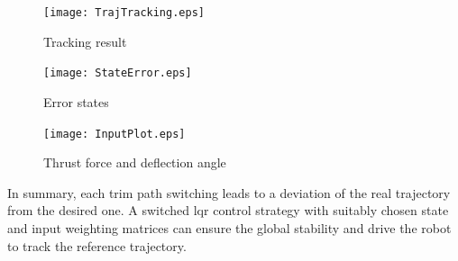 \begin{figure}[htb]
\centering
\texttt{[image: TrajTracking.eps]}
\caption{Tracking result}
\label{FIG:TrackingResult}
\end{figure}
\begin{figure}[htb]
\centering
\texttt{[image: StateError.eps]}
\caption{Error states}
\label{FIG:ErrorStates}
\end{figure}

\begin{figure}[thpb]
\centering
\texttt{[image: InputPlot.eps]}
\caption{Thrust force and deflection angle}
\label{FIG:ControlInputs}
\end{figure}

In summary, each trim path switching leads to a deviation of the real trajectory from the desired one. A switched \ac{lqr} control strategy with suitably chosen state and input weighting matrices can ensure the global stability and drive the robot to track the reference trajectory.

